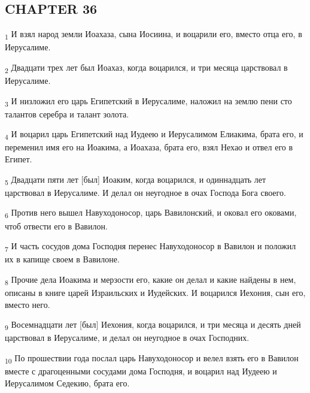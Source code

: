 \subsection{CHAPTER 36}
\begin{tcolorbox}
\textsubscript{1} И взял народ земли Иоахаза, сына Иосиина, и воцарили его, вместо отца его, в Иерусалиме.
\end{tcolorbox}
\begin{tcolorbox}
\textsubscript{2} Двадцати трех лет был Иоахаз, когда воцарился, и три месяца царствовал в Иерусалиме.
\end{tcolorbox}
\begin{tcolorbox}
\textsubscript{3} И низложил его царь Египетский в Иерусалиме, наложил на землю пени сто талантов серебра и талант золота.
\end{tcolorbox}
\begin{tcolorbox}
\textsubscript{4} И воцарил царь Египетский над Иудеею и Иерусалимом Елиакима, брата его, и переменил имя его на Иоакима, а Иоахаза, брата его, взял Нехао и отвел его в Египет.
\end{tcolorbox}
\begin{tcolorbox}
\textsubscript{5} Двадцати пяти лет [был] Иоаким, когда воцарился, и одиннадцать лет царствовал в Иерусалиме. И делал он неугодное в очах Господа Бога своего.
\end{tcolorbox}
\begin{tcolorbox}
\textsubscript{6} Против него вышел Навуходоносор, царь Вавилонский, и оковал его оковами, чтоб отвести его в Вавилон.
\end{tcolorbox}
\begin{tcolorbox}
\textsubscript{7} И часть сосудов дома Господня перенес Навуходоносор в Вавилон и положил их в капище своем в Вавилоне.
\end{tcolorbox}
\begin{tcolorbox}
\textsubscript{8} Прочие дела Иоакима и мерзости его, какие он делал и какие найдены в нем, описаны в книге царей Израильских и Иудейских. И воцарился Иехония, сын его, вместо него.
\end{tcolorbox}
\begin{tcolorbox}
\textsubscript{9} Восемнадцати лет [был] Иехония, когда воцарился, и три месяца и десять дней царствовал в Иерусалиме, и делал он неугодное в очах Господних.
\end{tcolorbox}
\begin{tcolorbox}
\textsubscript{10} По прошествии года послал царь Навуходоносор и велел взять его в Вавилон вместе с драгоценными сосудами дома Господня, и воцарил над Иудеею и Иерусалимом Седекию, брата его.
\end{tcolorbox}
